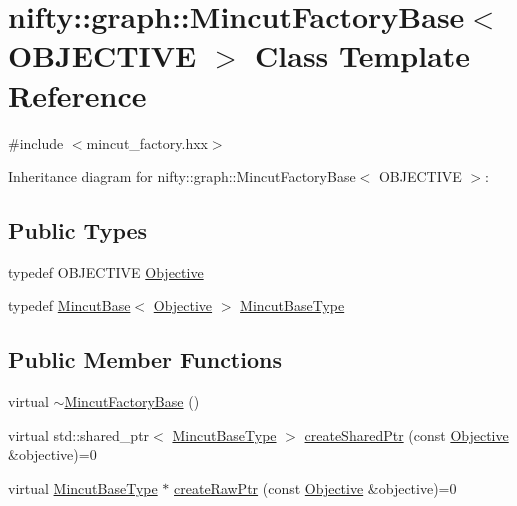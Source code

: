 \hypertarget{classnifty_1_1graph_1_1MincutFactoryBase}{}\section{nifty\+:\+:graph\+:\+:Mincut\+Factory\+Base$<$ O\+B\+J\+E\+C\+T\+I\+V\+E $>$ Class Template Reference}
\label{classnifty_1_1graph_1_1MincutFactoryBase}


{\ttfamily \#include $<$mincut\+\_\+factory.\+hxx$>$}



Inheritance diagram for nifty\+:\+:graph\+:\+:Mincut\+Factory\+Base$<$ O\+B\+J\+E\+C\+T\+I\+V\+E $>$\+:
\subsection*{Public Types}
\begin{DoxyCompactItemize}
\item 
typedef O\+B\+J\+E\+C\+T\+I\+V\+E \hyperlink{classnifty_1_1graph_1_1MincutFactoryBase_a25eccfa411235891dbe941520e7d05a6}{Objective}
\item 
typedef \hyperlink{classnifty_1_1graph_1_1MincutBase}{Mincut\+Base}$<$ \hyperlink{classnifty_1_1graph_1_1MincutFactoryBase_a25eccfa411235891dbe941520e7d05a6}{Objective} $>$ \hyperlink{classnifty_1_1graph_1_1MincutFactoryBase_a287f518ec34b184ac398e0d6e8d39419}{Mincut\+Base\+Type}
\end{DoxyCompactItemize}
\subsection*{Public Member Functions}
\begin{DoxyCompactItemize}
\item 
virtual \hyperlink{classnifty_1_1graph_1_1MincutFactoryBase_a8ec4c0e136a2105e95dcdc1b99614e52}{$\sim$\+Mincut\+Factory\+Base} ()
\item 
virtual std\+::shared\+\_\+ptr$<$ \hyperlink{classnifty_1_1graph_1_1MincutFactoryBase_a287f518ec34b184ac398e0d6e8d39419}{Mincut\+Base\+Type} $>$ \hyperlink{classnifty_1_1graph_1_1MincutFactoryBase_a55ea4e7c0dea7ea81f27b51a1b87c3f7}{create\+Shared\+Ptr} (const \hyperlink{classnifty_1_1graph_1_1MincutFactoryBase_a25eccfa411235891dbe941520e7d05a6}{Objective} \&objective)=0
\item 
virtual \hyperlink{classnifty_1_1graph_1_1MincutFactoryBase_a287f518ec34b184ac398e0d6e8d39419}{Mincut\+Base\+Type} $\ast$ \hyperlink{classnifty_1_1graph_1_1MincutFactoryBase_a91708f1c96eb24f8923114bea732333c}{create\+Raw\+Ptr} (const \hyperlink{classnifty_1_1graph_1_1MincutFactoryBase_a25eccfa411235891dbe941520e7d05a6}{Objective} \&objective)=0
\end{DoxyCompactItemize}


